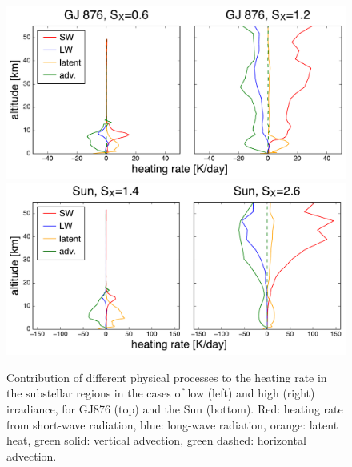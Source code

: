 \documentclass[11pt,numberedappendix,twocolappendix,]{emulateapj}
\begin{document}
\begin{figure}[tb]
    \begin{center}
\includegraphics[width=\hsize]{GJ876_heating_rate.pdf}
\includegraphics[width=\hsize]{Sun_heating_rate.pdf}
    \end{center}
    \caption{Contribution of different physical processes to the heating rate in the substellar regions in the cases of low (left) and high (right) irradiance, for GJ876 (top) and the Sun (bottom). Red: heating rate from short-wave radiation, blue: long-wave radiation, orange: latent heat, green solid: vertical advection, green dashed: horizontal advection.}
\label{fig:heating_rate}
\end{figure}
\end{document}
